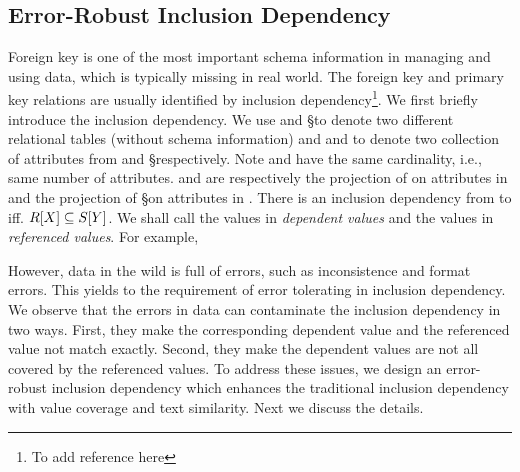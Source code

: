 






\subsection{Error-Robust Inclusion Dependency}\label{subsec:eind}




Foreign key is one of the most important schema information in managing and using data, which is typically missing in real world. The foreign key and primary key relations are usually identified by inclusion dependency\footnote{To add reference here}. We first briefly introduce the inclusion dependency. We use \R and \S to denote two different relational tables (without schema information) and \X and \Y to denote two collection of attributes from \R and \S respectively. Note \X and \Y have the same cardinality, i.e., same number of attributes. \RX and \SY are respectively the projection of \R on attributes in \X and the projection of \S on attributes in \Y. There is an inclusion dependency from \X to \Y iff. $R[X]\subseteq S[Y]$. We shall call the values in \RX \emph{dependent values} and the values in \SY \emph{referenced values}. For example, 

However, data in the wild is full of errors, such as inconsistence and format errors. This yields to the requirement of error tolerating in inclusion dependency. We observe that the errors in data can contaminate the inclusion dependency in two ways. First, they make the corresponding dependent value and the referenced value not match exactly. Second, they make the dependent values are not all covered by the referenced values. To address these issues, we design an error-robust inclusion dependency which enhances the traditional inclusion dependency with value coverage and text similarity. Next we discuss the details.


